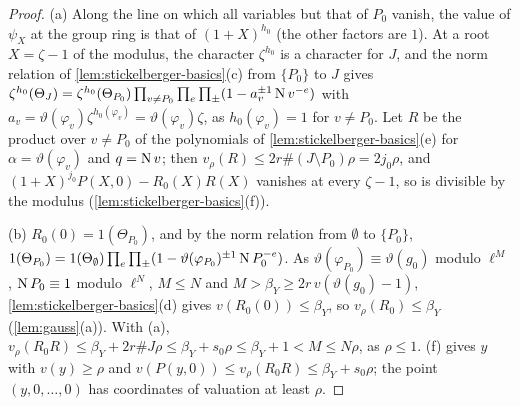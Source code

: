 \begin{proof}
(a) Along the line on which all variables but that of $P_0$ vanish, the value of $\psi_X$ at the group ring is that of $(1+X)^{h_0}$ (the other factors are $1$). At a root $X=\zeta-1$ of the modulus, the character $\zeta^{h_0}$ is a character for $J$, and the norm relation of \cref{lem:stickelberger-basics}(c) from $\{P_0\}$ to $J$ gives
$\zeta^{h_0}(\Theta_J)=\zeta^{h_0}(\Theta_{P_0})\prod_{v\ne P_0}\prod_e\prod_\pm(1-a_v^{\pm1}\operatorname{N} v^{-e})$ with $a_v=\vartheta(\varphi_v)\zeta^{h_0(\varphi_v)}=\vartheta(\varphi_v)\zeta$, as $h_0(\varphi_v)=1$ for $v\ne P_0$. Let $R$ be the product over $v\ne P_0$ of the polynomials of \cref{lem:stickelberger-basics}(e) for $\alpha=\vartheta(\varphi_v)$ and
$q=\operatorname{N} v$; then $v_\rho(R)\le2r\#(J\setminus P_0)\rho=2j_0\rho$, and $(1+X)^{j_0}P(X,0)-R_0(X)R(X)$ vanishes at every $\zeta-1$, so is divisible by the modulus (\cref{lem:stickelberger-basics}(f)).

(b) $R_0(0)=1(\Theta_{P_0})$, and by the norm relation from $\emptyset$ to $\{P_0\}$, $1(\Theta_{P_0})=1(\Theta_\emptyset)\prod_e\prod_\pm(1-\vartheta(\varphi_{P_0})^{\pm1}\operatorname{N} P_0^{-e})$. As $\vartheta(\varphi_{P_0})\equiv\vartheta(g_0)$ modulo $\ell^M$, $\operatorname{N} P_0\equiv1$ modulo $\ell^N$, $M\le N$ and $M>\beta_Y\ge2r\,v(\vartheta(g_0)-1)$, \cref{lem:stickelberger-basics}(d) gives $v(R_0(0))\le\beta_Y$, so
$v_\rho(R_0)\le\beta_Y$ (\cref{lem:gauss}(a)). With (a), $v_\rho(R_0R)\le\beta_Y+2r\#J\rho\le\beta_Y+s_0\rho\le\beta_Y+1<M\le N\rho$, as $\rho\le1$. (f) gives $y$ with $v(y)\ge\rho$ and $v(P(y,0))\le v_\rho(R_0R)\le\beta_Y+s_0\rho$; the point $(y,0,\dots,0)$ has coordinates of valuation at least $\rho$.
\end{proof}

